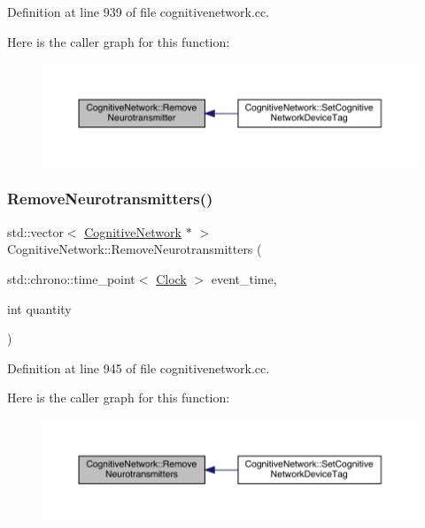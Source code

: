 Definition at line 939 of file cognitivenetwork.\+cc.

Here is the caller graph for this function\+:
\nopagebreak
\begin{figure}[H]
\begin{center}
\leavevmode
\includegraphics[width=350pt]{class_cognitive_network_ac0728c12a6d4bb87b6e8c9163435c8e6_icgraph}
\end{center}
\end{figure}
\mbox{\label{class_cognitive_network_a5e706084296ce84ff6884c1506213b03}} 
\subsubsection{\texorpdfstring{Remove\+Neurotransmitters()}{RemoveNeurotransmitters()}}
{\footnotesize\ttfamily std\+::vector$<$ \hyperlink{class_cognitive_network}{Cognitive\+Network} $\ast$ $>$ Cognitive\+Network\+::\+Remove\+Neurotransmitters (\begin{DoxyParamCaption}\item[{std\+::chrono\+::time\+\_\+point$<$ \hyperlink{universe_8h_a0ef8d951d1ca5ab3cfaf7ab4c7a6fd80}{Clock} $>$}]{event\+\_\+time,  }\item[{int}]{quantity }\end{DoxyParamCaption})}



Definition at line 945 of file cognitivenetwork.\+cc.

Here is the caller graph for this function\+:
\nopagebreak
\begin{figure}[H]
\begin{center}
\leavevmode
\includegraphics[width=350pt]{class_cognitive_network_a5e706084296ce84ff6884c1506213b03_icgraph}
\end{center}
\end{figure}
\mbox{\label{class_cognitive_network_a6ed0e198f6dcfdd45d57df5d3ad5754c}} 
